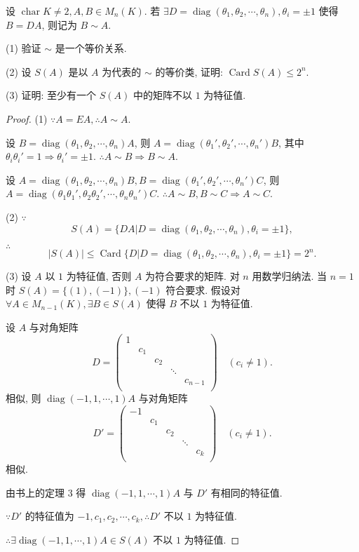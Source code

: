 \documentclass{ctexart}
\begin{document}
\begin{exercise}%
    设 $\operatorname{char}K\neq2,A,B\in M_n(K)$. 若 $\exists D=\operatorname{diag}(\theta_1,\theta_2,\cdots,\theta_n),\theta_i=\pm1$ 使得 $B=DA$, 则记为 $B\sim A$.

    (1) 验证 $\sim$ 是一个等价关系.

    (2) 设 $S(A)$ 是以 $A$ 为代表的 $\sim$ 的等价类, 证明: $\operatorname{Card}S(A)\leq2^n$.

    (3) 证明: 至少有一个 $S(A)$ 中的矩阵不以 $1$ 为特征值.
\end{exercise}
\begin{proof}
    (1) $\because A=EA,\therefore A\sim A$.

    设 $B=\operatorname{diag}(\theta_1,\theta_2,\cdots,\theta_n)A$, 则 $A=\operatorname{diag}(\theta_1',\theta_2',\cdots,\theta_n')B$, 其中 $\theta_i\theta_i'=1\Rightarrow\theta_i'=\pm1$. $\therefore A\sim B\Rightarrow B\sim A$.

    设 $A=\operatorname{diag}(\theta_1,\theta_2,\cdots,\theta_n)B,B=\operatorname{diag}(\theta_1',\theta_2',\cdots,\theta_n')C$, 则 $A=\operatorname{diag}(\theta_1\theta_1',\theta_2\theta_2',\cdots,\theta_n\theta_n')C$. $\therefore A\sim B,B\sim C\Rightarrow A\sim C$.

    (2) $\because$
    \[S(A)=\{DA|D=\operatorname{diag}(\theta_1,\theta_2,\cdots,\theta_n),\theta_i=\pm1\},\]

    $\therefore$
    \[|S(A)|\leq\operatorname{Card}\{D|D=\operatorname{diag}(\theta_1,\theta_2,\cdots,\theta_n),\theta_i=\pm1\}=2^n.\]

    (3) 设 $A$ 以 $1$ 为特征值, 否则 $A$ 为符合要求的矩阵. 对 $n$ 用数学归纳法. 当 $n=1$ 时 $S(A)=\{(1),(-1)\},(-1)$ 符合要求. 假设对 $\forall A\in M_{n-1}(K),\exists B\in S(A)$ 使得 $B$ 不以 $1$ 为特征值.
    
    设 $A$ 与对角矩阵
    \[D=\begin{pmatrix}
        1 \\
        & c_1 \\
        && c_2 \\
        &&& \ddots \\
        &&&& c_{n-1} \\
    \end{pmatrix}\quad(c_i\neq 1).\]
    相似, 则 $\operatorname{diag}(-1,1,\cdots,1)A$ 与对角矩阵
    \[D'=\begin{pmatrix}
        -1 \\
        & c_1 \\
        && c_2 \\
        &&& \ddots \\
        &&&& c_k \\
    \end{pmatrix}\quad(c_i\neq 1).\]
    相似.
    
    由书上的定理 3 得 $\operatorname{diag}(-1,1,\cdots,1)A$ 与 $D'$ 有相同的特征值.

    $\because D'$ 的特征值为 $-1,c_1,c_2,\cdots,c_k,\therefore D'$ 不以 $1$ 为特征值.

    $\therefore\exists\operatorname{diag}(-1,1,\cdots,1)A\in S(A)$ 不以 $1$ 为特征值.
\end{proof}
\end{document}
